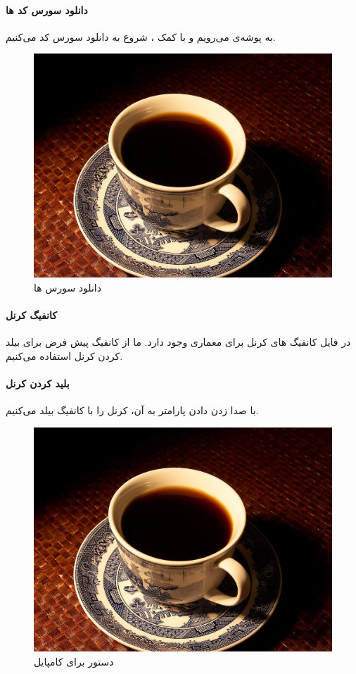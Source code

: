 \documentclass[12pt]{report}
\begin{document}
	\pagebreak
	
	
\paragraph{دانلود سورس کد ها}
به پوشه‌ی
 می‌رویم و با کمک ،
  شروع به دانلود سورس کد
    می‌کنیم.
	\begin{figure}[h!]
		\centering
		\includegraphics[width=.7\linewidth]{coffee.jpg}
		\caption{دانلود سورس ها}
		\label{fig:svn_checkout}
	\end{figure}
	
\paragraph{کانفیگ کرنل}
در فایل
کانفیگ های کرنل برای معماری  وجود دارد. ما از کانفیگ پیش فرض 
 برای بیلد کردن کرنل استفاده می‌کنیم.
\paragraph{بلید کردن کرنل}
با صدا زدن  دادن پارامتر  به آن، کرنل را با کانفیگ  بیلد می‌کنیم.

	\begin{figure}[h!]
		\centering
		\includegraphics[width=.7\linewidth]{coffee.jpg}
		\caption{دستور برای کامپایل}
		\label{fig:compile_kern}
	\end{figure}
\end{document}
